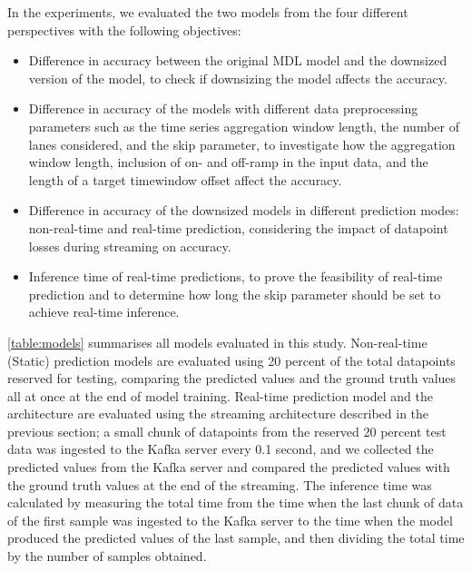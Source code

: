 \documentclass[11pt]{uonthesis}
\begin{document}
In the experiments, we evaluated the two models from the four different perspectives with the following objectives:
\begin{itemize}
    \item Difference in accuracy between the original MDL model and the downsized version of the model, to check if downsizing the model affects the accuracy.
    \item Difference in accuracy of the models with different data preprocessing parameters such as the time series aggregation window length, the number of lanes considered, and the skip parameter, to investigate how the aggregation window length, inclusion of on- and off-ramp in the input data, and the length of a target timewindow offset affect the accuracy.
    \item Difference in accuracy of the downsized models in different prediction modes: non-real-time and real-time prediction, considering the impact of datapoint losses during streaming on accuracy.
    \item Inference time of real-time predictions, to prove the feasibility of real-time prediction and to determine how long the skip parameter should be set to achieve real-time inference.
\end{itemize}

\ref{table:models} summarises all models evaluated in this study. Non-real-time (Static) prediction models are evaluated using 20 percent of the total datapoints reserved for testing, comparing the predicted values and the ground truth values all at once at the end of model training. Real-time prediction model and the architecture are evaluated using the streaming architecture described in the previous section; a small chunk of datapoints from the reserved 20 percent test data was ingested to the Kafka server every 0.1 second, and we collected the predicted values from the Kafka server and compared the predicted values with the ground truth values at the end of the streaming. The inference time was calculated by measuring the total time from the time when the last chunk of data of the first sample was ingested to the Kafka server to the time when the model produced the predicted values of the last sample, and then dividing the total time by the number of samples obtained.
\end{document}
